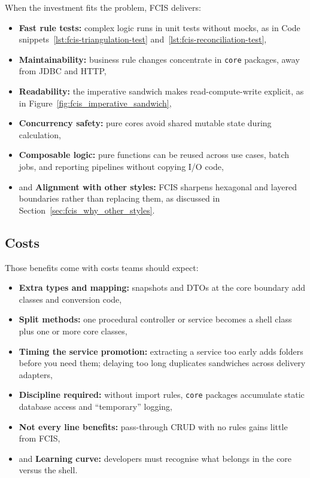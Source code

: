 When the investment fits the problem, FCIS delivers:
\begin{itemize}
    \item \textbf{Fast rule tests:} complex logic runs in unit tests without mocks, as in Code snippets~\ref{lst:fcis-triangulation-test} and~\ref{lst:fcis-reconciliation-test},
    \item \textbf{Maintainability:} business rule changes concentrate in \texttt{core} packages, away from JDBC and HTTP,
    \item \textbf{Readability:} the imperative sandwich makes read-compute-write explicit, as in Figure~\ref{fig:fcis_imperative_sandwich},
    \item \textbf{Concurrency safety:} pure cores avoid shared mutable state during calculation,
    \item \textbf{Composable logic:} pure functions can be reused across use cases, batch jobs, and reporting pipelines without copying I/O code,
    \item and \textbf{Alignment with other styles:} FCIS sharpens hexagonal and layered boundaries rather than replacing them, as discussed in Section~\ref{sec:fcis_why_other_styles}.
\end{itemize}

\subsection{Costs}
\label{sec:fcis_cons}

Those benefits come with costs teams should expect:
\begin{itemize}
    \item \textbf{Extra types and mapping:} snapshots and DTOs at the core boundary add classes and conversion code,
    \item \textbf{Split methods:} one procedural controller or service becomes a shell class plus one or more core classes,
    \item \textbf{Timing the service promotion:} extracting a service too early adds folders before you need them; delaying too long duplicates sandwiches across delivery adapters,
    \item \textbf{Discipline required:} without import rules, \texttt{core} packages accumulate static database access and ``temporary'' logging,
    \item \textbf{Not every line benefits:} pass-through CRUD with no rules gains little from FCIS,
    \item and \textbf{Learning curve:} developers must recognise what belongs in the core versus the shell.
\end{itemize}

